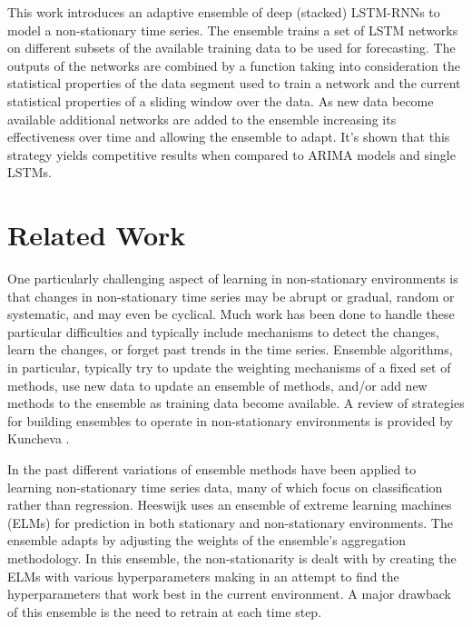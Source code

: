 \documentclass{article}
\begin{document}
This work introduces an adaptive ensemble of deep (stacked) LSTM-RNNs to model a non-stationary time series. The ensemble trains a set of LSTM networks on different subsets of the available training data to be used for forecasting. The outputs of the networks are combined by a function taking into consideration the statistical properties of the data segment used to train a network and the current statistical properties of a sliding window over the data. As new data become available additional networks are added to the ensemble increasing its effectiveness over time and allowing the ensemble to adapt. It's shown that this strategy yields competitive results when compared to ARIMA models and single LSTMs.


\section{Related Work}

One particularly challenging aspect of learning in non-stationary environments is that changes in non-stationary time series may be abrupt or gradual, random or systematic, and may even be cyclical. Much work has been done to handle these particular difficulties and typically include mechanisms to detect the changes, learn the changes, or forget past trends in the time series. Ensemble algorithms, in particular, typically try to update the weighting mechanisms of a fixed set of methods, use new data to update an ensemble of methods, and/or add new methods to the ensemble as training data become available. A review of strategies for building ensembles to operate in non-stationary environments is provided by Kuncheva \citep{kuncheva2004classifier}.

In the past different variations of ensemble methods have been applied to learning non-stationary time series data, many of which focus on classification rather than regression. Heeswijk \citep{van2009adaptive} uses an ensemble of extreme learning machines (ELMs) for prediction in both stationary and non-stationary environments. The ensemble adapts by adjusting the weights of the ensemble's aggregation methodology. In this ensemble, the non-stationarity is dealt with by creating the ELMs with various hyperparameters making in an attempt to find the hyperparameters that work best in the current environment. A major drawback of this ensemble is the need to retrain at each time step. 
\end{document}

